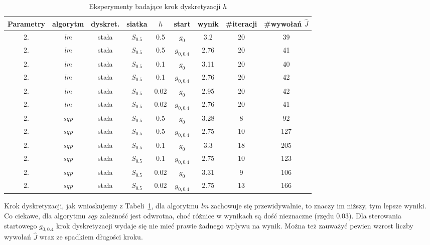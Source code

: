\documentclass[11pt]{article}
\begin{document}
\begin{table}[h]
  \begin{center}
    \begin{tabular}{|c|c|c|c|c|c|c|c|c|}
      \hline
      Parametry & algorytm & dyskret. & siatka & $h$ & start & wynik & \#iteracji & \#wywołań $\hat{J}$ \\
      \hline
      2. & {\it lm\/} & stała & $S_{0.5}$ & 0.5 & $g_0$ & 3.2 & 20 & 39 \\
      \hline
      2. & {\it lm\/} & stała & $S_{0.5}$ & 0.5 & $g_{0,0.4}$ & 2.76 & 20 & 41 \\
      \hline
      2. & {\it lm\/} & stała & $S_{0.5}$ & 0.1 & $g_0$ & 3.11 & 20 & 40 \\
      \hline
      2. & {\it lm\/} & stała & $S_{0.5}$ & 0.1 & $g_{0,0.4}$ & 2.76 & 20 & 42 \\
      \hline
      2. & {\it lm\/} & stała & $S_{0.5}$ & 0.02 & $g_0$ & 2.95 & 20 & 42 \\
      \hline
      2. & {\it lm\/} & stała & $S_{0.5}$ & 0.02 & $g_{0,0.4}$ & 2.76 & 20 & 41 \\
      \hline
      2. & {\it sqp\/} & stała & $S_{0.5}$ & 0.5 & $g_0$ & 3.28 & 8 & 92 \\
      \hline
      2. & {\it sqp\/} & stała & $S_{0.5}$ & 0.5 & $g_{0,0.4}$ & 2.75 & 10 & 127 \\
      \hline
      2. & {\it sqp\/} & stała & $S_{0.5}$ & 0.1 & $g_0$ & 3.3 & 18 & 205 \\
      \hline
      2. & {\it sqp\/} & stała & $S_{0.5}$ & 0.1 & $g_{0,0.4}$ & 2.75 & 10 & 123 \\
      \hline
      2. & {\it sqp\/} & stała & $S_{0.5}$ & 0.02 & $g_0$ & 3.31 & 9 & 106 \\
      \hline
      2. & {\it sqp\/} & stała & $S_{0.5}$ & 0.02 & $g_{0,0.4}$ & 2.75 & 13 & 166 \\
      \hline
    \end{tabular}    
    \caption{Eksperymenty badające krok dyskretyzacji $h$}\label{step_tbl}
  \end{center}
\end{table}

Krok dyskretyzacji, jak wnioskujemy z Tabeli~\ref{step_tbl}, dla algorytmu {\it lm\/} zachowuje się przewidywalnie, to znaczy im niższy, tym lepsze wyniki. Co ciekawe, dla algorytmu {\it sqp\/} zależność jest odwrotna, choć różnice w wynikach są dość nieznaczne (rzędu $0.03$). Dla sterowania startowego $g_{0,0.4}$ krok dyskretyzacji wydaje się nie mieć prawie żadnego wpływu na wynik. Można też zauważyć pewien wzrost liczby wywołań $\hat{J}$ wraz ze spadkiem długości kroku.
\end{document}
